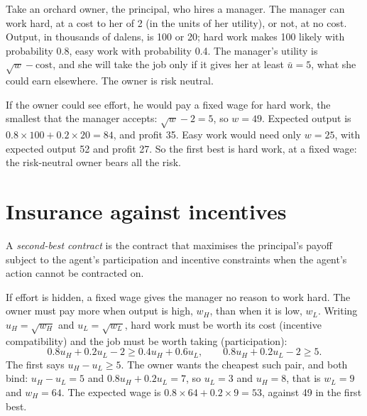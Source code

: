 Take an orchard owner, the principal, who hires a manager. The manager can work hard, at a cost to her of 2 (in the units
of her utility), or not, at no cost. Output, in thousands of dalens, is 100 or 20; hard work makes 100 likely with
probability 0.8, easy work with probability 0.4. The manager's utility is $\sqrt{w} - \text{cost}$, and she will take the job only
if it gives her at least $\bar u = 5$, what she could earn elsewhere. The owner is risk neutral.

If the owner could see effort, he would pay a fixed wage for hard work, the smallest that the manager accepts: $\sqrt{w} - 2
= 5$, so $w = 49$. Expected output is $0.8 \times 100 + 0.2 \times 20 = 84$, and profit 35. Easy work would need only $w = 25$, with expected output
52 and profit 27. So the first best is hard work, at a fixed wage: the risk-neutral owner bears all the risk.

\section{Insurance against incentives}\label{sec:b2:moral-hazard:second-best}

\begin{definition}\label{def:b2:moral-hazard:second-best}
A \emph{second-best contract} is the contract that maximises the principal's payoff
subject to the agent's participation and incentive constraints when the agent's action cannot be contracted on.
\end{definition}

If effort is hidden, a fixed wage gives the manager no reason to work hard. The owner must pay more when output is high,
$w_H$, than when it is low, $w_L$. Writing $u_H = \sqrt{w_H}$ and $u_L = \sqrt{w_L}$, hard work must be worth its cost (incentive
compatibility) and the job must be worth taking (participation):
\[
  0.8u_H + 0.2u_L - 2 \ge 0.4u_H + 0.6u_L, \qquad 0.8u_H + 0.2u_L - 2 \ge 5 .
\]
The first says $u_H - u_L \ge 5$. The owner wants the cheapest such pair, and both bind: $u_H - u_L = 5$ and $0.8u_H + 0.2u_L = 7$, so $u_L = 3$ and
$u_H = 8$, that is $w_L = 9$ and $w_H = 64$. The expected wage is $0.8 \times 64 + 0.2 \times 9 = 53$, against 49 in the first best.

